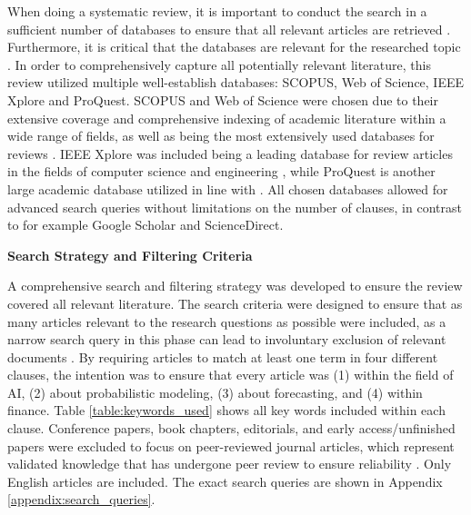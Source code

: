 When doing a systematic review, it is important to conduct the search in a sufficient number of databases to ensure that all relevant articles are retrieved \parencite{hiebl_2021}. Furthermore, it is critical that the databases are relevant for the researched topic \parencite{marzi_et_al_2024}. In order to comprehensively capture all potentially relevant literature, this review utilized multiple well-establish databases: SCOPUS, Web of Science, IEEE Xplore and ProQuest. SCOPUS and Web of Science were chosen due to their extensive coverage and comprehensive indexing of academic literature within a wide range of fields, as well as being the most extensively used databases for reviews \parencite{marzi_et_al_2024}. IEEE Xplore was included being a leading database for review articles in the fields of computer science and engineering \parencite{suhaimi2020systematic, carvalho2019systematic, cavacini2015best}, while ProQuest is another large academic database utilized in line with \textcite{gunnarsson2024}. All chosen databases allowed for advanced search queries without limitations on the number of clauses, in contrast to for example Google Scholar and ScienceDirect. 

\textbf{Search Strategy and Filtering Criteria}\nopagebreak

A comprehensive search and filtering strategy was developed to ensure the review covered all relevant literature. The search criteria were designed to ensure that as many articles relevant to the research questions as possible were included, as a narrow search query in this phase can lead to involuntary exclusion of relevant documents \parencite{marzi_et_al_2024,kuhrmann2017pragmatic, williams2021reexamining}. By requiring articles to match at least one term in four different clauses, the intention was to ensure that every article was (1) within the field of AI, (2) about probabilistic modeling, (3) about forecasting, and (4) within finance. Table \ref{table:keywords_used} shows all key words included within each clause. Conference papers, book chapters, editorials, and early access/unfinished papers were excluded to focus on peer-reviewed journal articles, which represent validated knowledge that has undergone peer review to ensure reliability \parencite{marzi_et_al_2024, hota2022hybrid}. Only English articles are included. The exact search queries are shown in Appendix \ref{appendix:search_queries}. 

